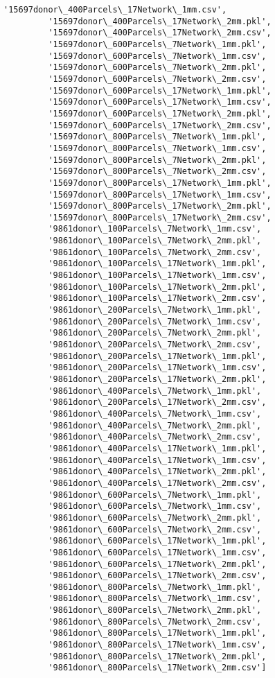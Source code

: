 \documentclass[11pt]{article}
\begin{document}
\begin{Verbatim}[commandchars=\\\{\}]
         '15697donor\_400Parcels\_17Network\_1mm.csv',
         '15697donor\_400Parcels\_17Network\_2mm.pkl',
         '15697donor\_400Parcels\_17Network\_2mm.csv',
         '15697donor\_600Parcels\_7Network\_1mm.pkl',
         '15697donor\_600Parcels\_7Network\_1mm.csv',
         '15697donor\_600Parcels\_7Network\_2mm.pkl',
         '15697donor\_600Parcels\_7Network\_2mm.csv',
         '15697donor\_600Parcels\_17Network\_1mm.pkl',
         '15697donor\_600Parcels\_17Network\_1mm.csv',
         '15697donor\_600Parcels\_17Network\_2mm.pkl',
         '15697donor\_600Parcels\_17Network\_2mm.csv',
         '15697donor\_800Parcels\_7Network\_1mm.pkl',
         '15697donor\_800Parcels\_7Network\_1mm.csv',
         '15697donor\_800Parcels\_7Network\_2mm.pkl',
         '15697donor\_800Parcels\_7Network\_2mm.csv',
         '15697donor\_800Parcels\_17Network\_1mm.pkl',
         '15697donor\_800Parcels\_17Network\_1mm.csv',
         '15697donor\_800Parcels\_17Network\_2mm.pkl',
         '15697donor\_800Parcels\_17Network\_2mm.csv',
         '9861donor\_100Parcels\_7Network\_1mm.csv',
         '9861donor\_100Parcels\_7Network\_2mm.pkl',
         '9861donor\_100Parcels\_7Network\_2mm.csv',
         '9861donor\_100Parcels\_17Network\_1mm.pkl',
         '9861donor\_100Parcels\_17Network\_1mm.csv',
         '9861donor\_100Parcels\_17Network\_2mm.pkl',
         '9861donor\_100Parcels\_17Network\_2mm.csv',
         '9861donor\_200Parcels\_7Network\_1mm.pkl',
         '9861donor\_200Parcels\_7Network\_1mm.csv',
         '9861donor\_200Parcels\_7Network\_2mm.pkl',
         '9861donor\_200Parcels\_7Network\_2mm.csv',
         '9861donor\_200Parcels\_17Network\_1mm.pkl',
         '9861donor\_200Parcels\_17Network\_1mm.csv',
         '9861donor\_200Parcels\_17Network\_2mm.pkl',
         '9861donor\_400Parcels\_7Network\_1mm.pkl',
         '9861donor\_200Parcels\_17Network\_2mm.csv',
         '9861donor\_400Parcels\_7Network\_1mm.csv',
         '9861donor\_400Parcels\_7Network\_2mm.pkl',
         '9861donor\_400Parcels\_7Network\_2mm.csv',
         '9861donor\_400Parcels\_17Network\_1mm.pkl',
         '9861donor\_400Parcels\_17Network\_1mm.csv',
         '9861donor\_400Parcels\_17Network\_2mm.pkl',
         '9861donor\_400Parcels\_17Network\_2mm.csv',
         '9861donor\_600Parcels\_7Network\_1mm.pkl',
         '9861donor\_600Parcels\_7Network\_1mm.csv',
         '9861donor\_600Parcels\_7Network\_2mm.pkl',
         '9861donor\_600Parcels\_7Network\_2mm.csv',
         '9861donor\_600Parcels\_17Network\_1mm.pkl',
         '9861donor\_600Parcels\_17Network\_1mm.csv',
         '9861donor\_600Parcels\_17Network\_2mm.pkl',
         '9861donor\_600Parcels\_17Network\_2mm.csv',
         '9861donor\_800Parcels\_7Network\_1mm.pkl',
         '9861donor\_800Parcels\_7Network\_1mm.csv',
         '9861donor\_800Parcels\_7Network\_2mm.pkl',
         '9861donor\_800Parcels\_7Network\_2mm.csv',
         '9861donor\_800Parcels\_17Network\_1mm.pkl',
         '9861donor\_800Parcels\_17Network\_1mm.csv',
         '9861donor\_800Parcels\_17Network\_2mm.pkl',
         '9861donor\_800Parcels\_17Network\_2mm.csv']
\end{Verbatim}
            

    
    
    
    
\end{document}
